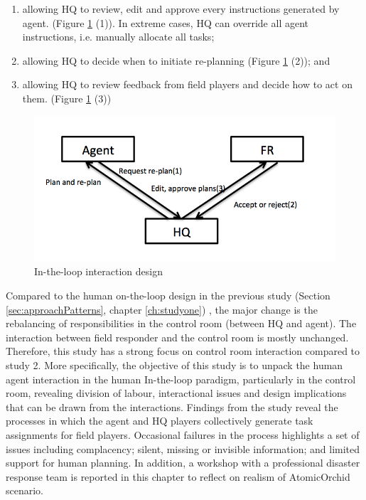 \begin{enumerate}
	\item allowing HQ to review, edit and approve every instructions generated by agent. (Figure \ref{fig:study2InTheLoop} (1)). In extreme cases, HQ can override all agent instructions, i.e. manually allocate all tasks;
	\item allowing HQ to decide when to initiate re-planning (Figure \ref{fig:study2InTheLoop} (2)); and
	\item allowing HQ to review feedback from field players and decide how to act on them. (Figure \ref{fig:study2InTheLoop} (3))
\end{enumerate}

\begin{figure}[h]
  \centering
  \includegraphics[width=1\textwidth]{img/study3/InTheLoop}
  \caption{In-the-loop interaction design}
  \label{fig:study2InTheLoop}
\end{figure}

Compared to the human on-the-loop design in the previous study (Section \ref{sec:approachPatterns}, chapter \ref{ch:studyone}) , the major change is the rebalancing of responsibilities in the control room (between HQ and agent). The interaction between field responder and the control room is mostly unchanged. Therefore, this study has a strong focus on control room interaction compared to study 2. More specifically, the objective of this study is to unpack the human agent interaction in the human In-the-loop paradigm, particularly in the control room, revealing division of labour, interactional issues and design implications that can be drawn from the interactions. Findings from the study reveal the processes in which the agent and HQ players collectively generate task assignments for field players. Occasional failures in the process highlights a set of issues including complacency; silent, missing or invisible information; and limited support for human planning. In addition, a workshop with a professional disaster response team is reported in this chapter to reflect on realism of AtomicOrchid scenario. \\


